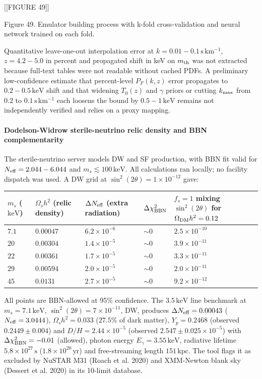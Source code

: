\documentclass[11pt,a4paper]{article}
\begin{document}
[[FIGURE 49]]

Figure 49. Emulator building process with k-fold cross-validation and neural network trained on each fold.

Quantitative leave-one-out interpolation error at $k = 0.01-0.1\,\mathrm{s\,km^{-1}}$, $z = 4.2-5.0$ in percent and propagated shift in keV on $m_{\rm th}$ was not extracted because full-text tables were not readable without cached PDFs. A preliminary low-confidence estimate that percent-level $P_F(k,z)$ error propagates to $0.2-0.5\,\mathrm{keV}$ shift and that widening $T_0(z)$ and $\gamma$ priors or cutting $k_{\rm max}$ from $0.2$ to $0.1\,\mathrm{s\,km^{-1}}$ each loosens the bound by $0.5-1\,\mathrm{keV}$ remains not independently verified and relies on a proxy mapping.

\paragraph{Dodelson-Widrow sterile-neutrino relic density and BBN complementarity}
The sterile-neutrino server models DW and SF production, with BBN fit valid for $N_{\rm eff} = 2.044-6.044$ and $m_s \lesssim 100\,\mathrm{keV}$. All calculations ran locally; no facility dispatch was used. A DW grid at $\sin^2(2\theta) = 1\times10^{-12}$ gave:

\begin{longtable}{@{}p{}p{}p{}p{}p{}@{}}
\toprule
\textbf{$m_s$ ($\mathrm{keV}$)} & \textbf{$\Omega_s h^2$ (relic density)} & \textbf{$\Delta N_{\rm eff}$ (extra radiation)} & \textbf{$\Delta\chi^2_{\rm BBN}$} & \textbf{$f_s=1$ mixing $\sin^2(2\theta)$ for $\Omega_{\rm DM}h^2 = 0.12$} \\ \midrule \endhead
$7.1$ & $0.00047$ & $6.2\times10^{-6}$ & $\sim 0$ & $2.5\times10^{-10}$ \\
$20$ & $0.00304$ & $1.4\times10^{-5}$ & $\sim 0$ & $3.9\times10^{-11}$ \\
$22$ & $0.00361$ & $1.7\times10^{-5}$ & $\sim 0$ & $3.3\times10^{-11}$ \\
$29$ & $0.00594$ & $2.0\times10^{-5}$ & $\sim 0$ & $2.0\times10^{-11}$ \\
$45$ & $0.0131$ & $2.7\times10^{-5}$ & $\sim 0$ & $9.2\times10^{-12}$ \\
\bottomrule\end{longtable}
All points are BBN-allowed at 95\% confidence. The $3.5\,\mathrm{keV}$ line benchmark at $m_s = 7.1\,\mathrm{keV}$, $\sin^2(2\theta) = 7\times10^{-11}$, DW, produces $\Delta N_{\rm eff} = 0.00043$ ($N_{\rm eff} = 3.0444$), $\Omega_s h^2 = 0.033$ ($27.5\%$ of dark matter), $Y_p = 0.2468$ (observed $0.2449 \pm 0.004$) and $D/H = 2.44\times10^{-5}$ (observed $2.547 \pm 0.025\times10^{-5}$) with $\Delta\chi^2_{\rm BBN} = -0.01$ (allowed), photon energy $E_\gamma = 3.55\,\mathrm{keV}$, radiative lifetime $5.8\times10^{27}\,\mathrm{s}$ ($1.8\times10^{20}\,\mathrm{yr}$) and free-streaming length $151\,\mathrm{kpc}$. The tool flags it as excluded by NuSTAR M31 (Roach et al. 2020) and XMM-Newton blank sky (Dessert et al. 2020) in its 10-limit database.
\end{document}
